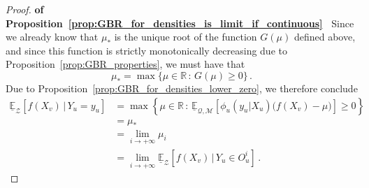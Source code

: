 \documentclass[twoside,11pt]{article}
\newcommand{\reals}{\mathbb{R}}
\newcommand{\lexp}{\underline{\mathbb{E}}_{\rateset,\mathcal{M}}}
\newcommand{\rateset}{\mathcal{Q}}
\begin{document}
\begin{proof}{\bf of Proposition~\ref{prop:GBR_for_densities_is_limit_if_continuous}~}
Since we already know that $\mu_*$ is the unique root of the function $G(\mu)$ defined above, and since this function is strictly monotonically decreasing due to Proposition~\ref{prop:GBR_properties}, we must have that
\begin{equation*}
\mu_* = \max\{\mu\in\reals\,:\, G(\mu)\geq 0\}\,.
\end{equation*}
Due to Proposition~\ref{prop:GBR_for_densities_lower_zero}, we therefore conclude
\begin{align*}
\underline{\mathbb{E}}_\mathcal{Z}[f(X_v)\,\vert\,Y_u=y_u] &= \max\left\{\mu\in\reals\,:\, \lexp\left[\phi_u(y_u\vert X_u)\bigl(f(X_v) - \mu\bigr)\right] \geq 0\right\} \\
 &= \mu_* \\
 &= \lim_{i\to+\infty} \mu_i \\
 &= \lim_{i\to+\infty} \underline{\mathbb{E}}_\mathcal{Z}[f(X_v)\,\vert\,Y_u\in O_u^i]\,.
\end{align*}
\end{proof}
\end{document}
